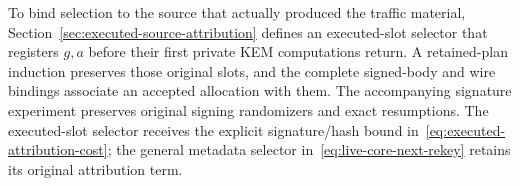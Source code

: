 To bind selection to the source that actually produced the traffic material,
Section~\ref{sec:executed-source-attribution} defines an executed-slot
selector that registers $g,a$ before their first private KEM computations
return. A retained-plan induction preserves those original slots, and the
complete signed-body and wire bindings associate an accepted allocation
with them. The accompanying signature experiment preserves original signing
randomizers and exact resumptions. The executed-slot selector receives the explicit signature/hash
bound in~\eqref{eq:executed-attribution-cost}; the general metadata selector
in~\eqref{eq:live-core-next-rekey} retains its original attribution term.
